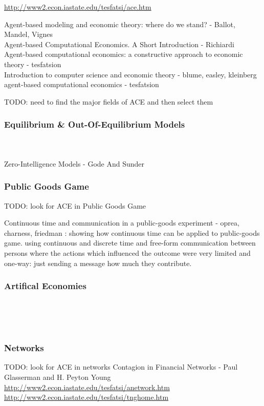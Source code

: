 \documentclass{article}
\begin{document}
\url{http://www2.econ.iastate.edu/tesfatsi/ace.htm}

\cite{mandel_2015} Agent-based modeling and economic theory: where do we stand? - Ballot, Mandel, Vignes \\
\cite{richiardi_2007} Agent-based Computational Economics. A Short Introduction - Richiardi \\
\cite{tesfatsion_2006} Agent-based computational economics: a constructive approach to economic theory - tesfatsion \\
\cite{kleinberg_easley_2015} Introduction to computer science and economic theory - blume, easley, kleinberg \\
\cite{tesfatsion_2002} agent-based computational economics - tesfatsion 

TODO: need to find the major fields of ACE and then select them

\subsubsection{Equilibrium \& Out-Of-Equilibrium Models}
\cite{Botta20114025} \\
\cite{Gintis2006} \\
\cite{gode_sunder_1991} Zero-Intelligence Models - Gode And Sunder \\

\subsubsection{Public Goods Game}
TODO: look for ACE in Public Goods Game

Continuous time and communication in a public-goods experiment - oprea, charness, friedman \cite{friedman_2012}: showing how continuous time can be applied to public-goods game. using continuous and discrete time and free-form communication between persons where the actions which influenced the outcome were very limited and one-way: just sending a message how much they contribute.

\subsubsection{Artifical Economies}
\cite{gintis_dynamics_2007} \\
\cite{emergent_gaffeo_gatti_2008} \\
\cite{adaptive_gaffeo_gatti_2008} \\

\subsubsection{Networks}
TODO: look for ACE in networks
\cite{glasserman_2015} Contagion in Financial Networks - Paul Glasserman and H. Peyton Young\\
\url{http://www2.econ.iastate.edu/tesfatsi/anetwork.htm}
\url{http://www2.econ.iastate.edu/tesfatsi/tnghome.htm}
\end{document}
